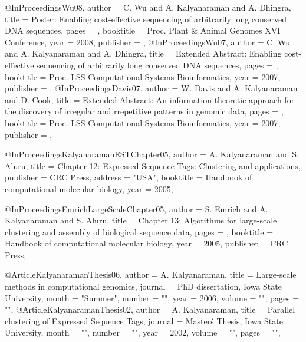 @InProceedings{Wu08,
  author =       {C. Wu and A. Kalyanaraman and A. Dhingra},
  title =        {{Poster: Enabling cost-effective sequencing of arbitrarily long conserved DNA sequences}},
  pages =        {},
  booktitle =    {Proc. Plant \& Animal Genomes XVI Conference},
  year =         {2008},
  publisher =    {},
}
@InProceedings{Wu07,
  author =       {C. Wu and A. Kalyanaraman and A. Dhingra},
  title =        {{Extended Abstract: Enabling cost-effective sequencing of arbitrarily long conserved DNA sequences}},
  pages =        {},
  booktitle =    {Proc. LSS Computational Systems Bioinformatics},
  year =         {2007},
  publisher =    {},
}
@InProceedings{Davis07,
  author =       {W. Davis and A. Kalyanaraman and D. Cook},
  title =        {Extended Abstract: An information theoretic approach for the discovery of irregular and rrepetitive patterns in genomic data},
  pages =        {},
  booktitle =    {Proc. LSS Computational Systems Bioinformatics},
  year =         {2007},
  publisher =    {},
}




@InProceedings{KalyanaramanESTChapter05,
  author =       {A. Kalyanaraman and S. Aluru},
  title =  {{Chapter 12: Expressed Sequence Tags: Clustering and applications}},
  publisher =    {CRC Press},
  address   =    "USA",
  booktitle =    {Handbook of computational molecular biology},
  year =         {2005},
}

@InProceedings{EmrichLargeScaleChapter05,
  author =       {S. Emrich and A. Kalyanaraman and S. Aluru},
  title =  {{Chapter 13: Algorithms for large-scale clustering and assembly of biological sequence data}},
  pages =        {},
  booktitle =    {Handbook of computational molecular biology},
  year =         {2005},
  publisher =    {CRC Press},
}


@Article{KalyanaramanThesis06,
   author =   {A. Kalyanaraman},
   title =   {Large-scale methods in computational genomics},
   journal =   {PhD dissertation, Iowa State University},
   month = "Summer",
   number = "",
   year =   {2006},
   volume =   "",
   pages =   "",
}
@Article{KalyanaramanThesis02,
   author =   {A. Kalyanaraman},
   title =   {Parallel clustering of Expressed Sequence Tags},
   journal =   {Master\'s Thesis, Iowa State University},
   month = "",
   number = "",
   year =   {2002},
   volume =   "",
   pages =   "",
}


